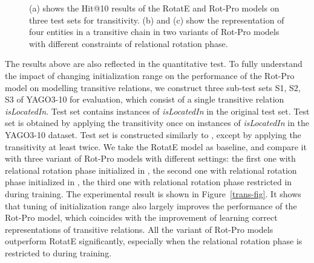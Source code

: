 \documentclass{article}
\begin{document}
\begin{figure}
  \centering
{}
\caption{(a) shows the Hit@10 results of the RotatE and Rot-Pro models on three test sets for transitivity. (b) and (c) show the representation of four entities in a transitive chain in two variants of Rot-Pro models with different constraints of relational rotation phase.}
\label{fig:trans-res}
\end{figure}
The results above are also reflected in the quantitative test.
To fully understand the impact of changing initialization range on the performance of the Rot-Pro model on modelling transitive relations, we construct three sub-test sets S1, S2, S3 of YAGO3-10 for evaluation, which consist of a single transitive relation \emph{isLocatedIn}. Test set  contains instances of \emph{isLocatedIn} in the original test set. Test set  is obtained by applying the transitivity once on instances of \emph{isLocatedIn} in the YAGO3-10 dataset.
Test set  is constructed similarly to , except by applying the transitivity at least twice. We take the RotatE model as baseline, and compare it with three variant of Rot-Pro models with different settings: the first one with relational rotation phase initialized in , the second one with relational rotation phase initialized in , the third one with relational rotation phase restricted in  during training. The experimental result is shown in Figure~\ref{trans-fig}.
It shows that tuning of initialization range also largely improves the performance of the Rot-Pro model, which coincides with the improvement of learning correct representations of transitive relations.
All the variant of Rot-Pro models outperform RotatE significantly, especially when the relational rotation phase is restricted to  during training.
\end{document}
